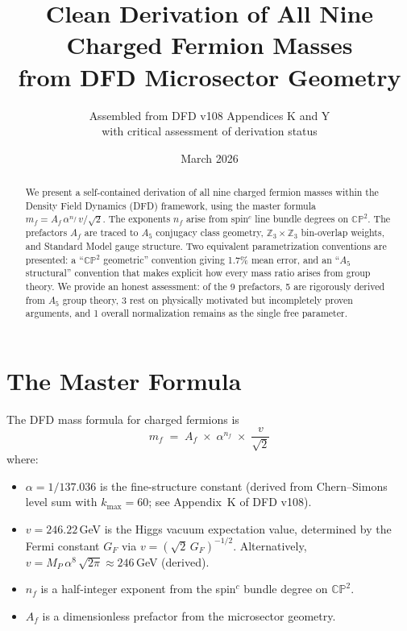 \documentclass[11pt,a4paper]{article}
\newcommand{\CP}{\mathbb{CP}}
\theoremstyle{definition}
\theoremstyle{remark}
\begin{document}
\title{Clean Derivation of All Nine Charged Fermion Masses\\
from DFD Microsector Geometry}

\author{Assembled from DFD v108 Appendices K and Y\\
with critical assessment of derivation status}

\date{March 2026}

\maketitle

\begin{abstract}
We present a self-contained derivation of all nine charged fermion masses
within the Density Field Dynamics (DFD) framework, using the master formula
$m_f = A_f\,\alpha^{n_f}\,v/\sqrt{2}$.  The exponents $n_f$ arise from
spin$^c$ line bundle degrees on $\CP^2$.  The prefactors $A_f$ are traced
to $A_5$ conjugacy class geometry, $\mathbb{Z}_3\times\mathbb{Z}_3$
bin-overlap weights, and Standard Model gauge structure.  Two equivalent
parametrization conventions are presented: a ``$\CP^2$ geometric'' convention
giving 1.7\% mean error, and an ``$A_5$ structural'' convention that makes
explicit how every mass ratio arises from group theory.  We provide an
honest assessment: of the 9 prefactors, 5 are rigorously derived from
$A_5$ group theory, 3 rest on physically motivated but incompletely proven
arguments, and 1 overall normalization remains as the single free parameter.
\end{abstract}

\tableofcontents

\section{The Master Formula}
\label{sec:master}

The DFD mass formula for charged fermions is
\begin{equation}\label{eq:master}
\boxed{m_f \;=\; A_f \;\times\; \alpha^{n_f} \;\times\; \frac{v}{\sqrt{2}}}
\end{equation}
where:
\begin{itemize}
\item $\alpha = 1/137.036$ is the fine-structure constant (derived from
  Chern--Simons level sum with $k_{\max} = 60$; see Appendix~K of DFD v108).
\item $v = 246.22$\,GeV is the Higgs vacuum expectation value, determined by the
  Fermi constant $G_F$ via $v = (\sqrt{2}\,G_F)^{-1/2}$.  Alternatively,
  $v = M_P\,\alpha^8\,\sqrt{2\pi} \approx 246$\,GeV (derived).
\item $n_f$ is a half-integer exponent from the spin$^c$ bundle degree on $\CP^2$.
\item $A_f$ is a dimensionless prefactor from the microsector geometry.
\end{itemize}
\end{document}
